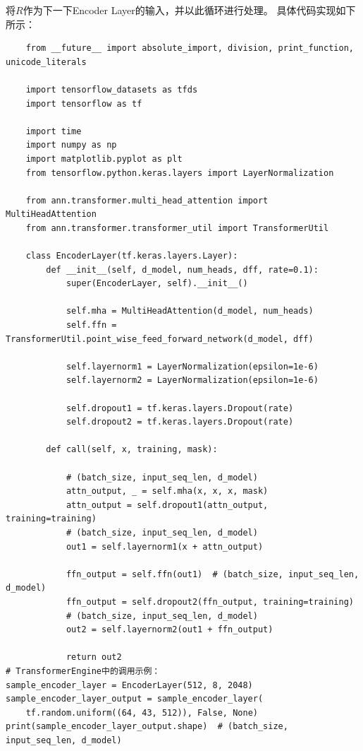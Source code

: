 \documentclass{article}
\begin{document}
将$R$作为下一下Encoder Layer的输入，并以此循环进行处理。\newline
具体代码实现如下所示：
\begin{lstlisting}
    from __future__ import absolute_import, division, print_function, unicode_literals

    import tensorflow_datasets as tfds
    import tensorflow as tf
    
    import time
    import numpy as np
    import matplotlib.pyplot as plt
    from tensorflow.python.keras.layers import LayerNormalization
    
    from ann.transformer.multi_head_attention import MultiHeadAttention
    from ann.transformer.transformer_util import TransformerUtil
    
    class EncoderLayer(tf.keras.layers.Layer):
        def __init__(self, d_model, num_heads, dff, rate=0.1):
            super(EncoderLayer, self).__init__()
    
            self.mha = MultiHeadAttention(d_model, num_heads)
            self.ffn = TransformerUtil.point_wise_feed_forward_network(d_model, dff)
    
            self.layernorm1 = LayerNormalization(epsilon=1e-6)
            self.layernorm2 = LayerNormalization(epsilon=1e-6)
    
            self.dropout1 = tf.keras.layers.Dropout(rate)
            self.dropout2 = tf.keras.layers.Dropout(rate)
    
        def call(self, x, training, mask):
    
            # (batch_size, input_seq_len, d_model)
            attn_output, _ = self.mha(x, x, x, mask)
            attn_output = self.dropout1(attn_output, training=training)
            # (batch_size, input_seq_len, d_model)
            out1 = self.layernorm1(x + attn_output)
    
            ffn_output = self.ffn(out1)  # (batch_size, input_seq_len, d_model)
            ffn_output = self.dropout2(ffn_output, training=training)
            # (batch_size, input_seq_len, d_model)
            out2 = self.layernorm2(out1 + ffn_output)
    
            return out2    
# TransformerEngine中的调用示例：
sample_encoder_layer = EncoderLayer(512, 8, 2048)
sample_encoder_layer_output = sample_encoder_layer(
    tf.random.uniform((64, 43, 512)), False, None)
print(sample_encoder_layer_output.shape)  # (batch_size, input_seq_len, d_model)
\end{lstlisting}
\end{document}
